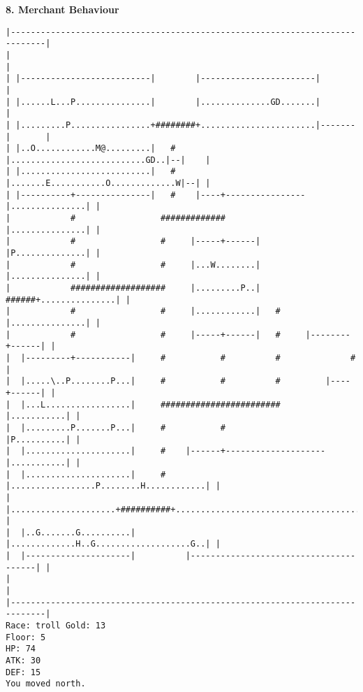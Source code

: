 \documentclass[11pt]{article}
\theoremstyle{plain}
\begin{document}
\textbf{8. Merchant Behaviour}

\begin{Verbatim}[fontsize=\scriptsize]
|-----------------------------------------------------------------------------|
|                                                                             |
| |--------------------------|        |-----------------------|               |
| |......L...P...............|        |..............GD.......|               |
| |.........P................+########+.......................|-------|       |
| |..O............M@.........|   #    |...........................GD..|--|    |
| |..........................|   #    |.......E...........O.............W|--| |
| |----------+---------------|   #    |----+----------------|...............| |
|            #                 #############                |...............| |
|            #                 #     |-----+------|         |P..............| |
|            #                 #     |...W........|         |...............| |
|            ###################     |.........P..|   ######+...............| |
|            #                 #     |............|   #     |...............| |
|            #                 #     |-----+------|   #     |--------+------| |
|  |---------+-----------|     #           #          #              #        |
|  |.....\..P........P...|     #           #          #         |----+------| |
|  |...L.................|     ########################         |...........| |
|  |.........P.......P...|     #           #                    |P..........| |
|  |.....................|     #    |------+--------------------|...........| |
|  |.....................|     #    |.................P........H............| |
|  |.....................+##########+.......................................| |
|  |..G.......G..........|          |.............H..G...................G..| |
|  |---------------------|          |---------------------------------------| |
|                                                                             |
|-----------------------------------------------------------------------------|
Race: troll Gold: 13                                                   Floor: 5
HP: 74
ATK: 30
DEF: 15
You moved north.
\end{Verbatim}
\end{document}
